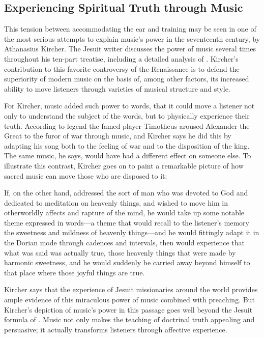 \subsection{Experiencing Spiritual Truth through Music}

This tension between accommodating the ear and training may be seen in one of
the most serious attempts to explain music's power in the seventeenth century,
by Athanasius Kircher.
The Jesuit writer discusses the power of music several times throughout his
ten-part treatise, including a detailed analysis of .%
    \Autocite[, ]{Kircher:Musurgia}
Kircher's contribution to this favorite controversy of the Renaissance is to
defend the superiority of modern music on the basis of, among other factors, its
increased ability to move listeners through varieties of musical structure and
style.

For Kircher, music added such power to words, that it could move a listener not
only to understand the subject of the words, but to physically experience their
truth.
According to legend the famed  player Timotheus aroused Alexander
the Great to the furor of war through music, and Kircher says he did this by
adapting his song both to the feeling of war and to the disposition of the
king.%
    \Autocites
    [Cf.][90]{Galilei:Dialogo}
    {Dryden:Alexander}
The same music, he says, would have had a different effect on someone else.
To illustrate this contrast, Kircher goes on to paint a remarkable picture of
how sacred music can move those who are disposed to it:
\begin{quoting}
    If, on the other hand,  addressed the sort of man who was
    devoted to God and dedicated to meditation on heavenly things, and wished to
    move him in otherworldly affects and rapture of the mind, he would take up
    some notable theme expressed in words---a theme that would recall to the
    listener's memory the sweetness and mildness of heavenly things---and he
    would fittingly adapt it in the Dorian mode through cadences and intervals,
    then  would experience that what was said was actually
    true, those heavenly things that were made by harmonic sweetness, and he
    would suddenly be carried away beyond himself to that place where those
    joyful things are true.%
        \Autocite[, ]{Kircher:Musurgia}
\end{quoting}
Kircher says that the experience of Jesuit missionaries around the world
provides ample evidence of this miraculous power of music combined with
preaching.
But Kircher's depiction of music's power in this passage goes well beyond the
Jesuit formula of .%
    \Autocite[35--51]{Bailey:Art}
Music not only makes the teaching of doctrinal truth appealing and persuasive;
it actually transforms listeners through affective experience.


